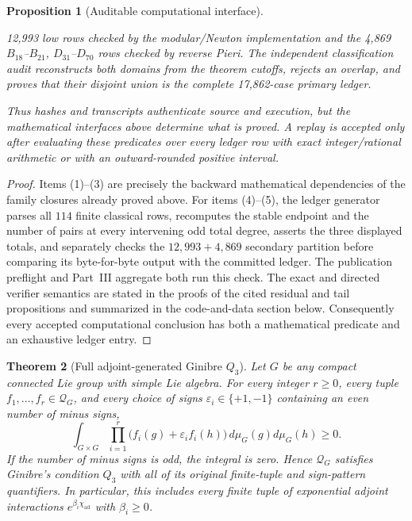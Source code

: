 \documentclass[11pt,reqno]{amsart}
\theoremstyle{plain}
\newtheorem{theorem}{Theorem}[section]
\newtheorem{proposition}[theorem]{Proposition}
\theoremstyle{definition}
\newcommand{\Qcone}{\mathcal Q}
\begin{document}
\begin{proposition}[Auditable computational interface]
\begin{enumerate}
12,993 low rows checked by the modular/Newton implementation and the 4,869
$B_{18}$--$B_{21}$, $D_{31}$--$D_{70}$ rows checked by reverse
Pieri.  The independent classification audit reconstructs both domains from
the theorem cutoffs, rejects an overlap, and proves that their disjoint union
is the complete 17,862-case primary ledger.
\end{enumerate}
Thus hashes and transcripts authenticate source and execution, but the
mathematical interfaces above determine what is proved.  A replay is accepted
only after evaluating these predicates over every ledger row with exact
integer/rational arithmetic or with an outward-rounded positive interval.
\end{proposition}

\begin{proof}
Items (1)--(3) are precisely the backward mathematical dependencies of the
family closures already proved above.  For items (4)--(5), the ledger generator
parses all $114$ finite classical rows, recomputes the stable endpoint and
the number of pairs at every intervening odd total degree, asserts the
three displayed totals, and separately checks the $12{,}993+4{,}869$
secondary partition before comparing its byte-for-byte output with the
committed ledger.  The publication preflight and Part~III aggregate both run
this check.  The exact and directed verifier semantics are stated in the
proofs of the cited residual and tail propositions and summarized in the
code-and-data section below.  Consequently every accepted computational
conclusion has both a mathematical predicate and an exhaustive ledger entry.
\end{proof}

\begin{theorem}[Full adjoint-generated Ginibre $Q_3$]
\label{thm:full-adjoint-generated-q3}
Let $G$ be any compact connected Lie group with simple Lie algebra.  For every
integer $r\geq0$, every tuple $f_1,\ldots,f_r\in\Qcone_G$, and every choice
of signs $\varepsilon_i\in\{+1,-1\}$ containing an even number of minus
signs,
\[
 \int_{G\times G}\prod_{i=1}^{r}
 \bigl(f_i(g)+\varepsilon_i f_i(h)\bigr)
 \,d\mu_G(g)d\mu_G(h)\geq0.
\]
If the number of minus signs is odd, the integral is zero.  Hence
$\Qcone_G$ satisfies Ginibre's condition $Q_3$ with all of its original
finite-tuple and sign-pattern quantifiers.  In particular, this includes
every finite tuple of exponential adjoint interactions
$e^{\beta_i\chi_{\mathrm{ad}}}$ with $\beta_i\geq0$.
\end{theorem}
\end{document}
